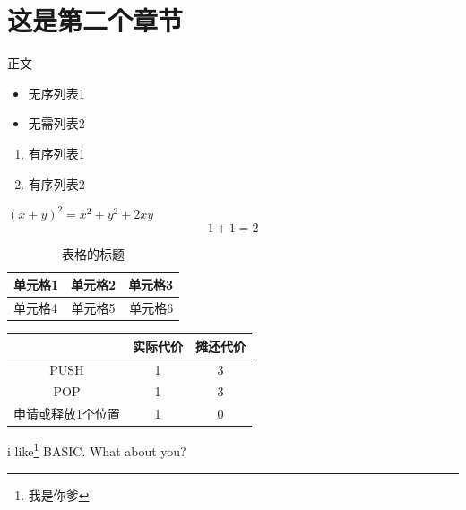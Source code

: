 \documentclass[UTF8]{ctexart}
\begin{document}
\section{这是第二个章节}
正文


\begin{itemize}
    \item 无序列表1
    \item 无需列表2
    
\end{itemize}


\begin{enumerate}
    \item 有序列表1
    \item 有序列表2

\end{enumerate}

$(x+y)^2=x^2+y^2+2xy$
\[
    1+1=2
\]


\begin{table}[H]%
    \centering
    \begin{tabular}{|p{2cm}|c|r|}%
        \hline
        单元格1 & 单元格2 & 单元格3 \\
        \hline\hline %
        单元格4 & 单元格5 & 单元格6 \\
        \hline
    \end{tabular}

    \caption{表格的标题}

\end{table}

\begin{table}[H]
    \centering
    \begin{tabular}{ccc}
    \hline
     & 实际代价 & 摊还代价 \\ \hline
    PUSH & 1 & 3 \\
    POP & 1 & 3 \\
    申请或释放1个位置 & 1 & 0 \\ \hline
    \end{tabular}
\end{table}

i like\footnote[1]{我是你爹} BASIC\@. What about you?
\end{document}
